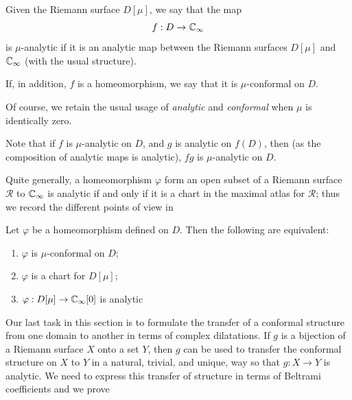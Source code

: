 \begin{definition}[$\mu$-analytic]
    Given the Riemann surface $D[\mu]$, we say that the map
    \begin{equation*}
        f: D \to \mathbb{C}_\infty
    \end{equation*}
    is $\mu$-analytic if it is an analytic map between the Riemann surfaces
    $D[\mu]$ and $\mathbb{C}_\infty$ (with the usual structure).
\end{definition}

\begin{definition}[$\mu$-conformal]
    If, in addition, $f$ is a homeomorphism, we say that it is $\mu$-conformal
    on $D$.
\end{definition}

Of course, we retain the usual usage of \emph{analytic} and \emph{conformal}
when $\mu$ is identically zero.

\begin{remark}
    Note that if $f$ is $\mu$-analytic on $D$, and $g$ is analytic on $f(D)$,
    then (as the composition of analytic maps is analytic), $fg$ is
    $\mu$-analytic on $D$. 
\end{remark}

Quite generally, a homeomorphism $\varphi$ form an open subset of a Riemann
surface $\mathcal{R}$ to $\mathbb{C}_\infty$ is analytic if and only if it is a chart in the
maximal atlas for $\mathcal{R}$; thus we record the different points of view in

\begin{lemma}
    \label{lem:characterizations_of_muconformal}
    Let $\varphi$ be a homeomorphism defined on $D$. Then the following are
    equivalent:
    \begin{enumerate}[label=(\roman*)]
        \item $\varphi$ is $\mu$-conformal on $D$;
        \item $\varphi$ is a chart for $D[\mu]$;
        \item $\varphi: D[\mu] \to \mathbb{C}_\infty[0]$ is analytic
    \end{enumerate}
\end{lemma}

Our last task in this section is to formulate the transfer of a conformal
structure from one domain to another in terms of complex dilatations. If $g$ is
a bijection of a Riemann surface $X$ onto a set $Y$, then $g$ can be used to
transfer the conformal  structure on $X$ to $Y$ in a natural, trivial, and
unique, way so that $g: X \to Y$ is analytic. We need to express this transfer
of structure in terms of Beltrami coefficients and we prove


